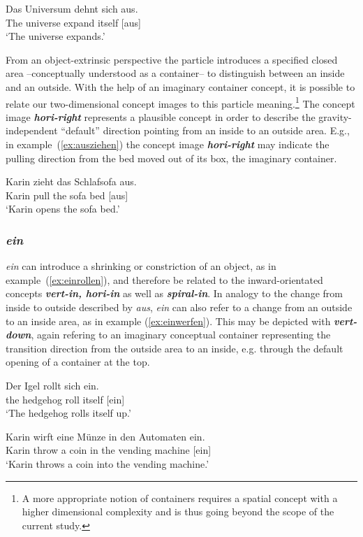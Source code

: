 \documentclass[output=paper]{langsci/langscibook}
\newcommand{\textci}[1]{\textit{\textbf{#1}}}
\begin{document}
\ea\label{ex:ausdehnen}
\gll Das Universum dehnt sich aus.\\
The universe expand itself [aus]\\
\glt `The universe expands.'
\z

From an object-extrinsic perspective the particle introduces a
specified closed area --conceptually understood as a container-- to
distinguish between an inside and an outside. With the help of an
imaginary container concept, it is possible to relate our
two-dimensional concept images to this particle meaning.\footnote{A more
  appropriate notion of containers requires a spatial concept with a
  higher dimensional complexity and is thus going beyond the scope of
  the current study.} The concept image \textci{hori-right} represents a
plausible concept in order to describe the gravity-independent
``default'' direction pointing from an inside to an outside area.
E.g., in example~(\ref{ex:ausziehen}) the concept image \textci{hori-right} may
indicate the pulling direction from the bed moved out of its box, the
imaginary container.

\ea\label{ex:ausziehen}
\gll Karin zieht das Schlafsofa aus.\\
Karin pull the {sofa bed} [aus]\\
\glt `Karin opens the sofa bed.'
\z

\vspace{+1mm}
\subsubsection{\textit{ein}}

\textit{ein} can introduce a shrinking or constriction of an object,
as in example~(\ref{ex:einrollen}), and therefore be related to the
inward-orientated concepts \textci{vert-in, hori-in} as well as
\textci{spiral-in}. In analogy to the change from inside to outside
described by \textit{aus}, \textit{ein} can also refer to a change
from an outside to an inside area, as in example
(\ref{ex:einwerfen}). This may be depicted with \textci{vert-down},
again refering to an imaginary conceptual container representing the
transition direction from the outside area to an inside, e.g.  through
the default opening of a container at the top.

\ea\label{ex:einrollen}
\gll Der Igel rollt sich ein.\\
the hedgehog roll itself [ein]\\
\glt `The hedgehog rolls itself up.'
\z

\ea\label{ex:einwerfen}
\gll Karin wirft eine Münze in den Automaten ein.\\
Karin throw a coin in the {vending machine} [ein]\\
\glt `Karin throws a coin into the vending machine.'
\z
\end{document}

